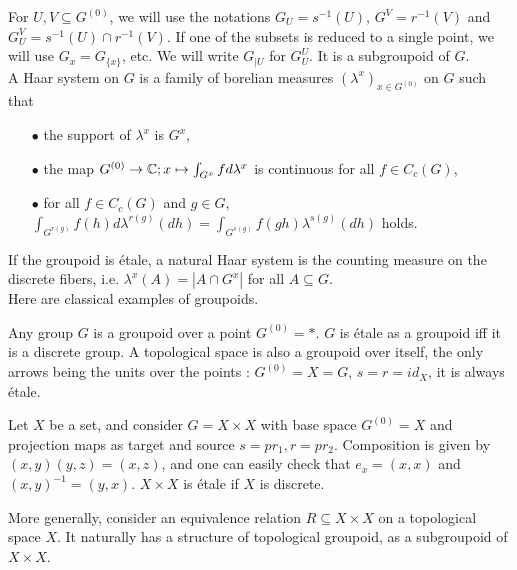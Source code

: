For $U,V\subseteq G^{(0)}$, we will use the notations $G_U=s^{-1}(U)$, $G^V=r^{-1}(V)$ and $G_U^V=s^{-1}(U)\cap r^{-1}(V)$. If one of the subsets is reduced to a single point, we will use $G_x=G_{\{x\}}$, etc. We will write $G_{|U}$ for $G_U^U$. It is a subgroupoid of $G$.\\

A Haar system on $G$ is a family of borelian measures $(\lambda^x)_{x\in G^{(0)}}$ on $G$ such that 
\begin{itemize}
\item[$\bullet$] the support of $\lambda^x$ is $G^x$, 
\item[$\bullet$] the map $G^{(0)} \rightarrow \mathbb C; x\mapsto \int_{G^x} f d\lambda^x$ is continuous for all $f\in C_c(G)$,
\item[$\bullet$] for all $f\in C_c(G)$ and $g\in G$, $\int_{G^{r(g)}} f(h) d\lambda^{r(g)}(dh)= \int_{G^{s(g)}} f(gh) \lambda^{s(g)}(dh)$ holds.
\end{itemize}

If the groupoid is étale, a natural Haar system is the counting measure on the discrete fibers, i.e. $\lambda^x(A) = |A\cap G^x|$ for all $A\subseteq G$.\\

Here are classical examples of groupoids.

\begin{Expl} Any group $G$ is a groupoid over a point $G^{(0)}=*$. $G$ is étale as a groupoid iff it is a discrete group. A topological space is also a groupoid over itself, the only arrows being the units over the points : $G^{(0)} = X = G$, $s=r=id_X$, it is always étale.
\end{Expl}

\begin{Expl} Let $X$ be a set, and consider $G=X\times X$ with base space $G^{(0)}=X$ and projection maps as target and source $s=pr_1, r=pr_2$. Composition is given by $(x,y)(y,z)= (x,z)$, and one can easily check that $e_x=(x,x)$ and $(x,y)^{-1} = (y,x)$. $X\times X$ is étale if $X$ is discrete.
\end{Expl}

\begin{Expl} More generally, consider an equivalence relation $R \subseteq X\times X$ on a topological space $X$. It naturally has a structure of topological groupoid, as a subgroupoid of $X\times X$. 
\end{Expl}

